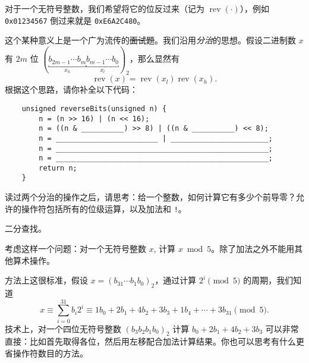     \begin{example}[模拟操作 2]
        对于一个无符号整数，我们希望将它的位反过来（记为 $\operatorname{rev}(\cdot)$），例如 \texttt{0x01234567} 倒过来就是 \texttt{0xE6A2C480}。

        这个某种意义上是一个广为流传的\sout{面试题}。我们沿用\emph{分治}的思想。假设二进制数 $x$ 有 $2m$ 位 $(\underbracket{b_{2m-1} \dotsm b_m}_{x_h} \underbracket{b_{m-1} \dotsm b_0}_{x_l})_2$，那么显然有
        \[ \operatorname{rev}(x) = \operatorname{rev}(x_l) \operatorname{rev}(x_h). \]
        根据这个思路，请你补全以下代码：
        \begin{verbatim}
    unsigned reverseBits(unsigned n) {
        n = (n >> 16) | (n << 16);
        n = ((n & __________) >> 8) | ((n & __________) << 8);
        n = ________________________ | _______________________;
        n = __________________________________________________;
        n = __________________________________________________;
        return n;
    }
        \end{verbatim}

        读过两个分治的操作之后，请思考：给一个整数，如何计算它有多少个前导零？允许的操作符包括所有的位级运算，以及加法和 \texttt{!}。\begin{hint} 二分查找。 \end{hint}
    \end{example}

    \begin{example}[算术运算]
        考虑这样一个问题：对一个无符号整数 $x$, 计算 $x \bmod 5$。除了加法之外不能用其他算术操作。

        方法上这很标准，假设 $x=(b_{31} \dotsm b_1b_0)_2$，通过计算 $2^i \pmod 5$ 的周期，我们知道
        \[ x \equiv \sum_{i=0}^{31} b_i2^i \equiv 1b_0+2b_1+4b_2+3b_3+1b_4 + \dotsb + 3b_{31} \pmod 5. \]
        技术上，对一个四位无符号整数 $(b_3b_2b_1b_0)_2$ 计算 $b_0+2b_1+4b_2+3b_3$ 可以非常直接：比如首先取得各位，然后用左移配合加法计算结果。你也可以思考有什么更省操作符数目的方法。
    \end{example}